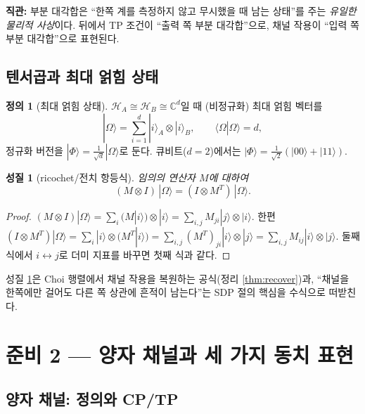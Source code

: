 \documentclass[11pt,a4paper]{article}
\newcommand{\Hcal}{\mathcal{H}}
\theoremstyle{definition}
\newtheorem{definition}{정의}[section]
\theoremstyle{plain}
\newtheorem{property}{성질}[section]
\theoremstyle{remark}
\begin{document}
\begin{intuitionbox}
\textbf{직관:} 부분 대각합은 ``한쪽 계를 측정하지 않고 무시했을 때 남는 상태''를 주는 \emph{유일한 물리적 사상}이다. 뒤에서 TP 조건이 ``출력 쪽 부분 대각합''으로, 채널 작용이 ``입력 쪽 부분 대각합''으로 표현된다.
\end{intuitionbox}

\subsection{텐서곱과 최대 얽힘 상태}

\begin{definition}[최대 얽힘 상태]
$\Hcal_A\cong\Hcal_B\cong\mathbb{C}^d$일 때 (비정규화) 최대 얽힘 벡터를
\[
|\Omega\rangle=\sum_{i=1}^{d}|i\rangle_A\otimes|i\rangle_B,\qquad \langle\Omega|\Omega\rangle=d,
\]
정규화 버전을 $|\Phi\rangle=\tfrac{1}{\sqrt d}|\Omega\rangle$로 둔다. 큐비트($d=2$)에서는 $|\Phi\rangle=\tfrac1{\sqrt2}(|00\rangle+|11\rangle)$.
\end{definition}

\begin{property}[ricochet/전치 항등식]\label{prop:ricochet}
임의의 연산자 $M$에 대하여
\[
(M\otimes I)\,|\Omega\rangle=(I\otimes M^{T})\,|\Omega\rangle .
\]
\end{property}
\begin{proof}
$(M\otimes I)|\Omega\rangle=\sum_i (M|i\rangle)\otimes|i\rangle=\sum_{i,j}M_{ji}|j\rangle\otimes|i\rangle$. 한편 $(I\otimes M^T)|\Omega\rangle=\sum_i|i\rangle\otimes(M^T|i\rangle)=\sum_{i,j}(M^T)_{ji}|i\rangle\otimes|j\rangle=\sum_{i,j}M_{ij}|i\rangle\otimes|j\rangle$. 둘째 식에서 $i\leftrightarrow j$로 더미 지표를 바꾸면 첫째 식과 같다.
\end{proof}

성질 \ref{prop:ricochet}은 Choi 행렬에서 채널 작용을 복원하는 공식(정리 \ref{thm:recover})과, ``채널을 한쪽에만 걸어도 다른 쪽 상관에 흔적이 남는다''는 SDP 절의 핵심을 수식으로 떠받친다.

\section{준비 2 --- 양자 채널과 세 가지 동치 표현}

\subsection{양자 채널: 정의와 CP/TP}
\end{document}
